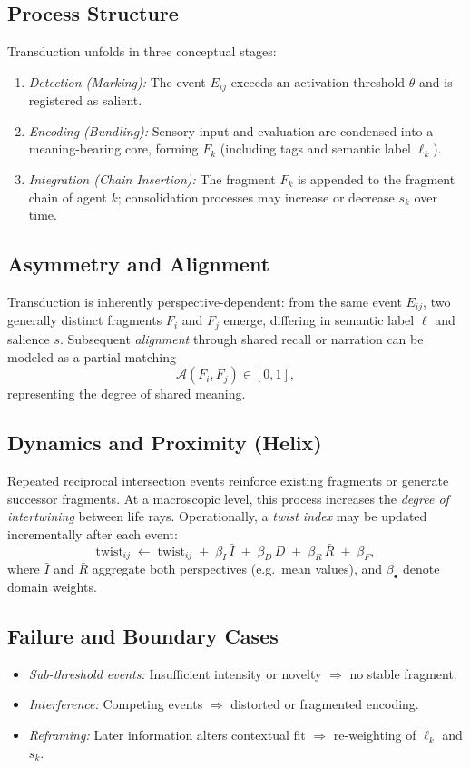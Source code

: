\documentclass[12pt,a4paper]{article}
\begin{document}
\medskip
\subsection{Process Structure}
Transduction unfolds in three conceptual stages:
\begin{enumerate}
    \item \emph{Detection (Marking):}
    The event $E_{ij}$ exceeds an activation threshold $\theta$
    and is registered as salient.
    \item \emph{Encoding (Bundling):}
    Sensory input and evaluation are condensed into a
    meaning-bearing core, forming $F_k$
    (including tags and semantic label $\ell_k$).
    \item \emph{Integration (Chain Insertion):}
    The fragment $F_k$ is appended to the fragment chain of
    agent $k$; consolidation processes may increase or decrease
    $s_k$ over time.
\end{enumerate}

\medskip
\subsection{Asymmetry and Alignment}
Transduction is inherently perspective-dependent:
from the same event $E_{ij}$, two generally distinct fragments
$F_i$ and $F_j$ emerge, differing in semantic label $\ell$
and salience $s$.
Subsequent \emph{alignment} through shared recall or narration
can be modeled as a partial matching
\[
\mathcal{A}(F_i,F_j)\in[0,1],
\]
representing the degree of shared meaning.

\medskip
\subsection{Dynamics and Proximity (Helix)}
Repeated reciprocal intersection events reinforce existing
fragments or generate successor fragments.
At a macroscopic level, this process increases the
\emph{degree of intertwining} between life rays.
Operationally, a \emph{twist index} may be updated incrementally
after each event:
\[
\text{twist}_{ij}
\;\leftarrow\;
\text{twist}_{ij}
\;+\;
\beta_I\,\bar I
\;+\;
\beta_D\,D
\;+\;
\beta_R\,\bar R
\;+\;
\beta_F,
\]
where $\bar I$ and $\bar R$ aggregate both perspectives
(e.g.\ mean values), and $\beta_\bullet$ denote domain weights.

\subsection{Failure and Boundary Cases}
\begin{itemize}
    \item \emph{Sub-threshold events:}
    Insufficient intensity or novelty $\Rightarrow$ no stable fragment.
    \item \emph{Interference:}
    Competing events $\Rightarrow$ distorted or fragmented encoding.
    \item \emph{Reframing:}
    Later information alters contextual fit $\Rightarrow$
    re-weighting of $\ell_k$ and $s_k$.
\end{itemize}
\end{document}
